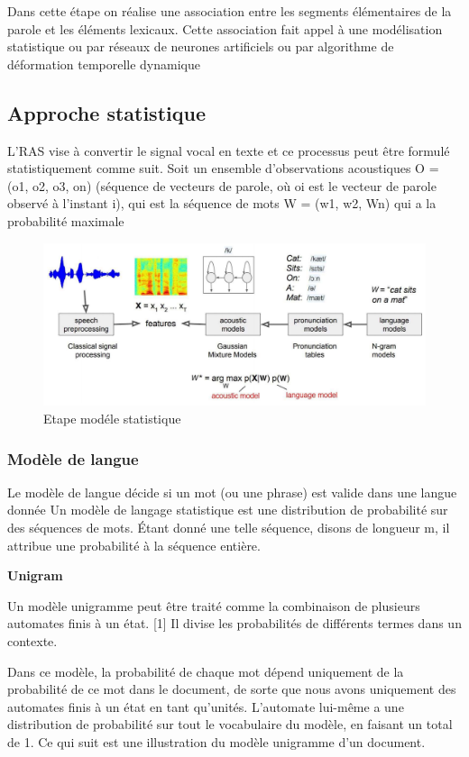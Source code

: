 \documentclass[a4paper, 12pt]{book}
\begin{document}
Dans cette étape on réalise une association entre les segments élémentaires de la parole et les éléments lexicaux. Cette association fait appel à une modélisation statistique ou par réseaux de neurones artificiels ou par algorithme de déformation temporelle dynamique

\subsection{Approche statistique}

L’RAS vise à convertir le signal vocal en texte et ce processus peut être formulé statistiquement comme suit. Soit un ensemble d'observations acoustiques O = (o1, o2, o3, on) (séquence de vecteurs de parole, où oi est le vecteur de parole observé à l'instant i), qui est la séquence de mots W = (w1, w2, Wn) qui a la probabilité maximale


\begin{figure}[htbp]
  \centering
  \includegraphics[width=1\linewidth]{fig/model.png}
  \caption{Etape modéle statistique}
\end{figure}

\subsubsection{Modèle de langue}

Le modèle de langue décide si un mot (ou une phrase) est valide dans une langue donnée Un modèle de langage statistique est une distribution de probabilité sur des séquences de mots. Étant donné une telle séquence, disons de longueur m, il attribue une probabilité à la séquence entière.

\textbf{Unigram}

Un modèle unigramme peut être traité comme la combinaison de plusieurs automates finis à un état. [1] Il divise les probabilités de différents termes dans un contexte.

Dans ce modèle, la probabilité de chaque mot dépend uniquement de la probabilité de ce mot dans le document, de sorte que nous avons uniquement des automates finis à un état en tant qu'unités. L'automate lui-même a une distribution de probabilité sur tout le vocabulaire du modèle, en faisant un total de 1. Ce qui suit est une illustration du modèle unigramme d'un document.
\end{document}
